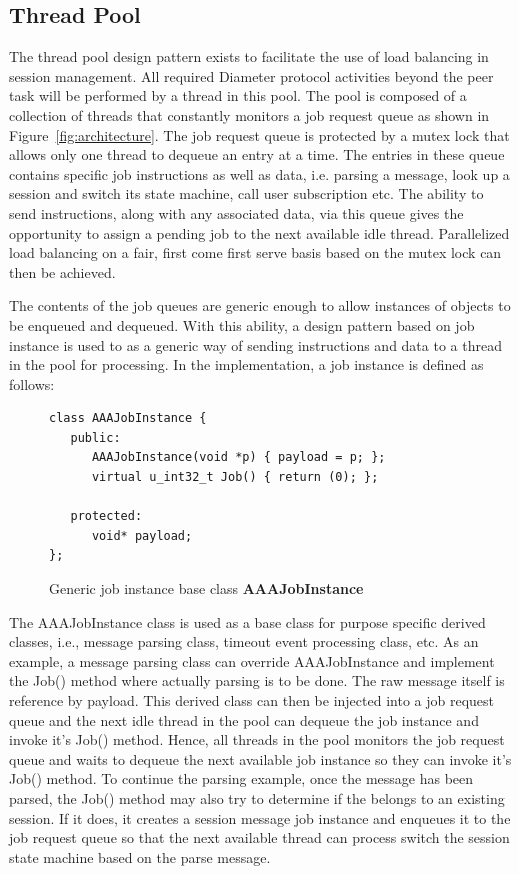 \documentclass{article}
\begin{document}
\subsection{Thread Pool\label{sec:pool}}

The thread pool design pattern exists to facilitate the use of load
balancing in session management. All required Diameter protocol
activities beyond the peer task will be performed by a thread in this
pool. The pool is composed of a collection of threads that constantly
monitors a job request queue as shown in
Figure~\ref{fig:architecture}. The job request queue is protected by a
mutex lock that allows only one thread to dequeue an entry at a
time. The entries in these queue contains specific job instructions as
well as data, i.e. parsing a message, look up a session and switch its
state machine, call user subscription etc. The ability to send
instructions, along with any associated data, via this queue gives the
opportunity to assign a pending job to the next available idle
thread. Parallelized load balancing on a fair, first come first serve
basis based on the mutex lock can then be achieved.

The contents of the job queues are generic enough to allow instances of
objects to be enqueued and dequeued. With this ability, a design pattern
based on job instance is used to as a generic way of sending
instructions and data to a thread in the pool for processing. In the
implementation, a job instance is defined as follows:

\begin{figure}[htbp]
\begin{center}
\begin{verbatim}
class AAAJobInstance {
   public:
      AAAJobInstance(void *p) { payload = p; };
      virtual u_int32_t Job() { return (0); };

   protected:
      void* payload;
};
\end{verbatim}
\caption{Generic job instance base class {\bf AAAJobInstance}\label{fig:jobsource}}
\end{center}
\end{figure}

The AAAJobInstance class is used as a base class for purpose specific
derived classes, i.e., message parsing class, timeout event processing
class, etc. As an example, a message parsing class can override
AAAJobInstance and implement the Job() method where actually parsing is
to be done. The raw message itself is reference by payload.  This
derived class can then be injected into a job request queue and the next
idle thread in the pool can dequeue the job instance and invoke it's
Job() method. Hence, all threads in the pool monitors the job request
queue and waits to dequeue the next available job instance so they can
invoke it's Job() method. To continue the parsing example, once the
message has been parsed, the Job() method may also try to determine if
the belongs to an existing session. If it does, it creates a session
message job instance and enqueues it to the job request queue so that
the next available thread can process switch the session state machine
based on the parse message.
\end{document}

